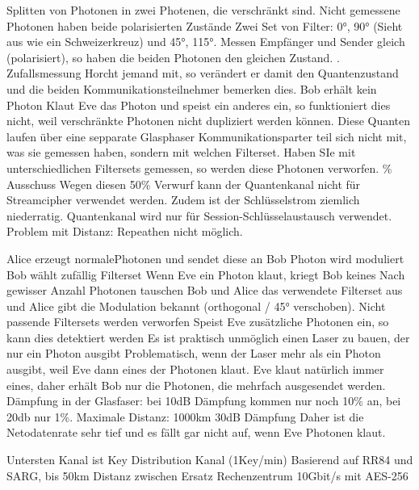 \documentclass[ngerman,a4paper,12pt]{scrreprt}
\begin{document}
Splitten von Photonen in zwei Photenen, die verschränkt sind.
\ul
	\li Nicht gemessene Photonen haben beide polarisierten Zustände
	\li Zwei Set von Filter: 0°, 90° (Sieht aus wie ein Schweizerkreuz) und 45°, 115°.
	\li Messen Empfänger und Sender gleich (polarisiert), so haben die beiden Photonen den gleichen Zustand.
	. Zufallsmessung
	\li Horcht jemand mit, so verändert er damit den Quantenzustand und die beiden Kommunikationsteilnehmer bemerken dies. \ra Bob erhält kein Photon
	\li Klaut Eve das Photon und speist ein anderes ein, so funktioniert dies nicht, weil verschränkte Photonen nicht dupliziert werden können.
	\li Diese Quanten laufen über eine sepparate Glasphaser
	\li Kommunikationsparter teil sich nicht mit, was sie gemessen haben, sondern mit welchen Filterset. Haben SIe mit unterschiedlichen Filtersets gemessen, so werden diese Photonen verworfen. \% Ausschuss
	\li Wegen diesen 50\% Verwurf kann der Quantenkanal nicht für Streamcipher verwendet werden. Zudem ist der Schlüsselstrom ziemlich niederratig. \ra Quantenkanal wird nur für Session-Schlüsselaustausch verwendet.
	\li Problem mit Distanz: Repeathen nicht möglich.
\ulE

\ul
	\li Alice erzeugt normalePhotonen und sendet diese an Bob
	\li Photon wird moduliert
	\li Bob wählt zufällig Filterset
	\li Wenn Eve ein Photon klaut, kriegt Bob keines
	\li Nach gewisser Anzahl Photonen tauschen Bob und Alice das verwendete Filterset aus und Alice gibt die Modulation bekannt (orthogonal / 45° verschoben). \ra Nicht passende Filtersets werden verworfen
	\li Speist Eve zusätzliche Photonen ein, so kann dies detektiert werden
	\li Es ist praktisch unmöglich einen Laser zu bauen, der nur ein Photon ausgibt
	\li Problematisch, wenn der Laser mehr als ein Photon ausgibt, weil Eve dann eines der Photonen klaut. \ra Eve klaut natürlich immer eines, daher erhält Bob nur die Photonen, die mehrfach ausgesendet werden.
	\li Dämpfung in der Glasfaser: bei 10dB Dämpfung kommen nur noch 10\% an, bei 20db nur 1\%.
	\li Maximale Distanz: 1000km \ra 30dB Dämpfung
	\li Daher ist die Netodatenrate sehr tief und es fällt gar nicht auf, wenn Eve Photonen klaut.
\ulE


\ul
	\li Untersten Kanal ist Key Distribution Kanal (1Key/min)
	\li Basierend auf RR84 und SARG, bis 50km Distanz zwischen Ersatz Rechenzentrum
	\li 10Gbit/s mit AES-256
\ulE
{}
\end{document}
